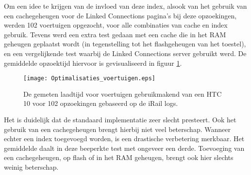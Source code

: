 Om een idee te krijgen van de invloed van deze index, alsook van het gebruik van een cachegeheugen voor de Linked Connections pagina's bij deze opzoekingen, werden 102 voertuigen opgezocht, voor alle combinaties van cache en index gebruik. Tevens werd een extra test gedaan met een cache die in het RAM geheugen geplaatst wordt (in tegenstelling tot het flashgeheugen van het toestel), en een vergelijkende test waarbij de Linked Connections server gebruikt werd. De gemiddelde opzoektijd hiervoor is gevisualiseerd in figuur \ref{fig:vehiclelabtest}.

\begin{figure}[h]
	\centering
	\texttt{[image: Optimalisaties\_voertuigen.eps]}
	\caption[Gemeten laadtijd voertuigen]{De gemeten laadtijd voor voertuigen gebruikmakend van een HTC 10 voor 102 opzoekingen gebaseerd op de iRail logs. }
	\label{fig:vehiclelabtest}
\end{figure}

%		
%		

Het is duidelijk dat de standaard implementatie zeer slecht presteert. Ook het gebruik van een cachegeheugen brengt hierbij niet veel beterschap. Wanneer echter een index toegevoegd worden, is een drastische verbetering merkbaar. Het gemiddelde daalt in deze beeperkte test met ongeveer een derde. Toevoeging van een cachegeheugen, op flash of in het RAM geheugen, brengt ook hier slechts weinig beterschap. 


